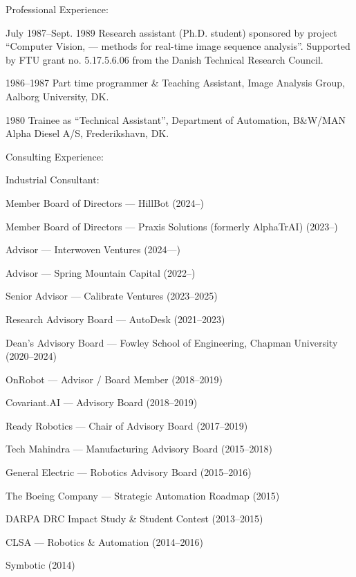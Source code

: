 \documentclass{article}
\newenvironment{sublist}{%
  \begin{list}{}{%
      \setlength{\itemsep}{0em}\setlength{\parsep}{0em}%
      \setlength{\topsep}{0em}\setlength{\parskip}{0em}%
    }%
}%
{ \end{list} }
\begin{document}
\begin{cv}
\begin{cvlist}{Professional Experience:}
		\item[July 1987--Sept. 1989] Research assistant (Ph.D. student) sponsored
		by project ``Computer Vision, --- methods for real-time image
		sequence analysis''. Supported by FTU grant no. 5.17.5.6.06 from the
		Danish Technical Research Council.

		\item[1986--1987] Part time programmer \& Teaching Assistant,
		Image Analysis Group, Aalborg University, DK.\@

		\item[1980] Trainee as ``Technical Assistant'', Department of
		Automation, B\&W/MAN Alpha Diesel A/S, Frederikshavn, DK.\@
	\end{cvlist}

	\begin{cvlist}{Consulting Experience:}
		\item Industrial Consultant:
		\begin{sublist}
			\item Member Board of Directors --- HillBot (2024--)
			\item Member Board of Directors --- Praxis Solutions (formerly AlphaTrAI) (2023--)
			\item Advisor --- Interwoven Ventures (2024---)
			\item Advisor --- Spring Mountain Capital (2022--)
			\item Senior Advisor --- Calibrate Ventures (2023--2025)
			\item Research Advisory Board --- AutoDesk (2021--2023)
			\item Dean's Advisory Board --- Fowley School of Engineering, Chapman University (2020--2024)
			\item OnRobot --- Advisor / Board Member (2018--2019)
			\item Covariant.AI --- Advisory Board (2018--2019)
			\item Ready Robotics --- Chair of Advisory Board (2017--2019)
			\item Tech Mahindra --- Manufacturing Advisory Board (2015--2018)
			\item General Electric --- Robotics Advisory Board (2015--2016)
			\item The Boeing Company --- Strategic Automation Roadmap (2015)
			\item DARPA DRC Impact Study \& Student Contest (2013--2015)
			\item CLSA --- Robotics \& Automation (2014--2016)
			\item Symbotic (2014)

\end{sublist}
\end{cvlist}
\end{cv}
\end{document}
